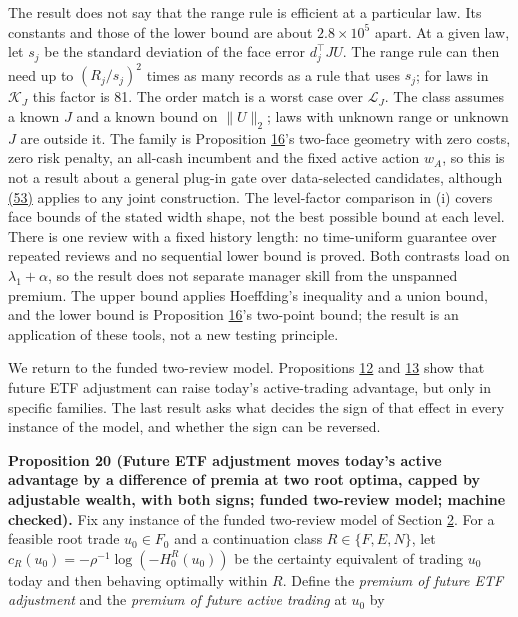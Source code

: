 \documentclass[11pt]{article}
\begin{document}
The result does not say that the range rule is efficient at a
particular law. Its constants and those of the lower bound are
about \(2.8\times10^5\) apart. At a given law, let
\(s_j\) be the standard deviation of the face error
\(d_j^\top JU\). The range rule can then need up to
\((R_j/s_j)^2\) times as many records as a rule that uses
\(s_j\); for laws in \(\mathcal K_J\) this factor is 81.
The order match is a worst case over \(\mathcal L_J\). The class assumes a known \(J\) and a known
bound on \(\|U\|_2\); laws with unknown range or unknown
\(J\) are outside it. The family is Proposition \hyperref[res:Proposition-16]{16}'s two-face
geometry with zero costs, zero risk penalty, an all-cash
incumbent and the fixed active action \(w_A\), so this is not
a result about a general plug-in gate over data-selected
candidates, although \hyperref[eq:53]{(53)} applies to any joint construction.
The level-factor comparison in (i) covers face bounds of the
stated width shape, not the best possible bound at each level.
There is one review with a fixed history length: no
time-uniform guarantee over repeated reviews and no sequential
lower bound is proved. Both contrasts load on
\(\lambda_1+\alpha\), so the result does not separate manager
skill from the unspanned premium. The upper bound applies
Hoeffding's inequality and a union bound, and the lower bound is
Proposition \hyperref[res:Proposition-16]{16}'s two-point bound; the result is an application
of these tools, not a new testing principle.

We return to the funded two-review model. Propositions \hyperref[res:Proposition-12]{12} and \hyperref[res:Proposition-13]{13}
show that future ETF adjustment can raise today's active-trading
advantage, but only in specific families. The last result asks
what decides the sign of that effect in every instance of the
model, and whether the sign can be reversed.

\label{res:Proposition-20}
\textbf{Proposition 20 (Future ETF adjustment moves today's active advantage by a difference of premia at two root optima, capped by adjustable wealth, with both signs; funded two-review model; machine checked).}
Fix any instance of the funded two-review model of Section \hyperref[sec:2]{2}.
For a feasible root trade \(u_0\in F_0\) and a continuation
class \(R\in\{F,E,N\}\), let
\(c_R(u_0)=-\rho^{-1}\log(-H_0^R(u_0))\) be the certainty
equivalent of trading \(u_0\) today and then behaving optimally
within \(R\). Define the \emph{premium of future ETF adjustment} and
the \emph{premium of future active trading} at \(u_0\) by
\end{document}
